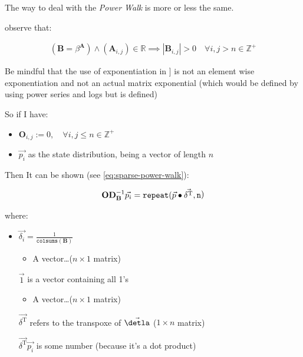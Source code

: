 \documentclass[11pt]{article}
\begin{document}
The way to deal with the \emph{Power Walk} is more or less the same.

observe that:

$$\begin{aligned}
   \left( \mathbf{B} = \beta^{\mathbf{A}} \right)\wedge \left( \mathbf{A}_{i, j}\right)\in \mathbb{R}  \implies  \left\lvert \mathbf{B}_{i, j} \right\rvert > 0 \quad \forall i,j>n\in \mathbb{Z}^+ \label{eq:b-is-pos}\end{aligned}$$



Be mindful that the use of exponentiation in
] is not an element wise exponentiation
and not an actual matrix exponential (which would be defined by using
power series and logs but is defined)

So if I have:

\begin{itemize}
\item \(\mathbf{O}_{i, j} := 0, \quad \forall i,j\leq n \in \mathbb{Z}^+\)

\item \(\vec{p_i}\) as the state distribution, being a vector of length \(n\)
\end{itemize}

Then It can be shown (see \eqref{eq:sparse-power-walk}):

$$\begin{aligned}
    \mathbf{O} \mathbf{D}_{\mathbf{B}}^{-1} \vec{p_i} = \mathtt{repeat} (\vec{p} \bullet \vec{\delta^{\tiny \mathrm{T}}} \mathtt{, n}\end{aligned})$$



where:

\begin{itemize}
\item \(\vec{\delta_i} = \frac{1}{\mathtt{colsums} \left( \mathbf{B} \right)}\)
\begin{itemize}
\item A vector\ldots{}(\(n\times 1\) matrix)
\end{itemize}
\item[{\(\vec{1}\) }] is a vector containing all 1's
\begin{itemize}
\item A vector\ldots{}(\(n\times 1\) matrix)
\end{itemize}
\item[{\(\vec{\delta^{\mathrm{T}}}\)}] refers to the transpoxe of \(\vec{\detla}\) (\(1\times n\) matrix)
\item[{\(\vec{\delta^{\mathrm{T}}} \vec{p_{i}}\)}] is some number (because it's a dot product)
\end{itemize}
\end{document}
